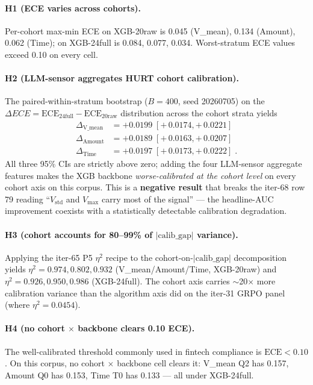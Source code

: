 \documentclass{article}
\begin{document}
\paragraph{H1 (ECE varies across cohorts).}
Per-cohort max-min ECE on XGB-20raw is 0.045 (V\_mean), 0.134 (Amount),
0.062 (Time); on XGB-24full is 0.084, 0.077, 0.034. Worst-stratum ECE values
exceed 0.10 on every cell.

\paragraph{H2 (LLM-sensor aggregates HURT cohort calibration).}
The paired-within-stratum bootstrap ($B=400$, seed 20260705) on the
$\Delta ECE = \mathrm{ECE}_{\mathrm{24full}} - \mathrm{ECE}_{\mathrm{20raw}}$
distribution across the cohort strata yields
\begin{align*}
  \Delta_{\text{V\_mean}} &= +0.0199 \; [+\,0.0174, +\,0.0221] \\
  \Delta_{\text{Amount}} &= +0.0189 \; [+\,0.0163, +\,0.0207] \\
  \Delta_{\text{Time}}   &= +0.0197 \; [+\,0.0173, +\,0.0222] \; .
\end{align*}
All three 95\% CIs are strictly above zero; adding the four LLM-sensor
aggregate features makes the XGB backbone \emph{worse-calibrated at the
cohort level} on every cohort axis on this corpus. This is a
\textbf{negative result} that breaks the iter-68 row 79 reading ``$V_{\text{std}}$
and $V_{\max}$ carry most of the signal'' --- the headline-AUC improvement
coexists with a statistically detectable calibration degradation.

\paragraph{H3 (cohort accounts for 80--99\% of $|\mathrm{calib\_gap}|$ variance).}
Applying the iter-65 P5 $\eta^2$ recipe to the cohort-on-$|\mathrm{calib\_gap}|$
decomposition yields $\eta^2 = 0.974, 0.802, 0.932$ (V\_mean/Amount/Time, XGB-20raw)
and $\eta^2 = 0.926, 0.950, 0.986$ (XGB-24full). The cohort axis carries
$\sim$20$\times$ more calibration variance than the algorithm axis did on the
iter-31 GRPO panel (where $\eta^2 = 0.0454$).

\paragraph{H4 (no cohort $\times$ backbone clears 0.10 ECE).}
The well-calibrated threshold commonly used in fintech compliance is
$\mathrm{ECE} < 0.10$. On this corpus, no cohort $\times$ backbone cell
clears it: V\_mean Q2 has 0.157, Amount Q0 has 0.153, Time T0 has 0.133 --- all
under XGB-24full.
\end{document}
